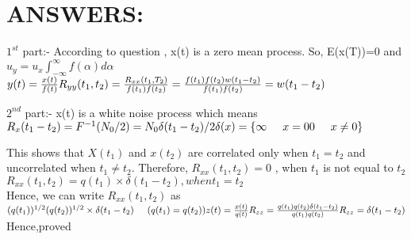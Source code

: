 \documentclass{beamer}
\begin{document}
\section{ANSWERS: }
\begin{frame}{$1^{st}$ part:-}
According to question , x(t) is a zero mean process. So, E(x(T))=0 and 
$ u_y=u_x\int_{-\infty}^\infty f(\alpha) d\alpha $\\

$y(t)=\frac{x(t)}{f(t)}\\
R_{yy}(t_1,t_2)= \frac{R_{xx}(t_1,T_2)}{f(t_1)f(t_2)}\\
=\frac{f(t_1)f(t_2)w(t_1-t_2)}{f(t_1)f(t_2)}\\
=w(t_1-t_2)$ 

\end{frame}
\begin{frame}{$2^{nd} $ part:-}
x(t) is a white noise process which means \\
$R_x(t_1-t_2)=F^{-1}(N_0/2)= {N_0 \delta(t_1-t_2)}/2\\
\delta(x)=\{    \infty \hspace{0.5cm} x=0 \\
                  0 \hspace{0.5cm}   x\not=0 \} $
                  
                 This shows that  $X(t_1)$ and $x(t_2) $ are correlated only when $t_1=
                 t_2$ and uncorrelated when $t_1  \not = t_2$.
                 Therefore, $R_{xx}(t_1,t_2)=0$ , when $t_1$ is not equal to $t_2 $\\
                $ R_{xx}(t_1,t_2)=q(t_1) \times \delta(t_1-t_2) , when t_1=t_2 $\\
                 Hence, we can  write $R_{xx}(t_1,t_2) $ as
                 $ (q(t_1))^{1/2} (q(t_2))^{1/2} \times \delta(t_1-t_2) \hspace{0.5cm} (q(t_1)=q(t_2) )\\
                  z(t)=\frac{x(t)}{q(t)}         \\
                  R_{zz}=\frac{q(t_1) q(t_2) \delta(t_1-t_2) }{q(t_1)q(t_2)}\\
                  R_{zz}=\delta(t_1-t_2) $\\
                  Hence,proved 
            

\end{frame}
\end{document}
